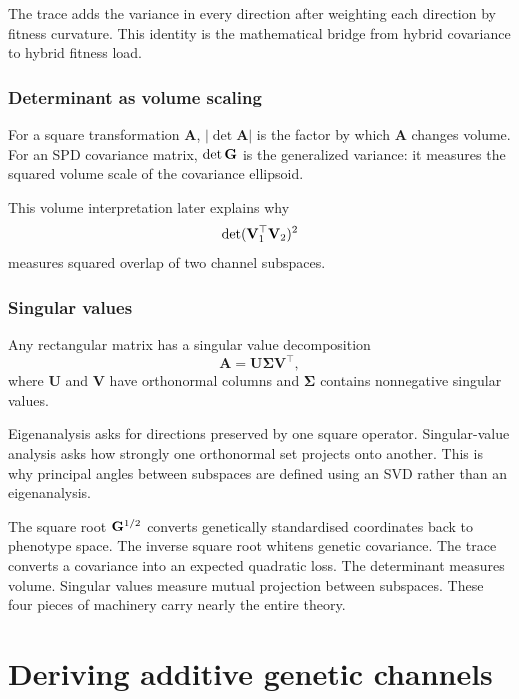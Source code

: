 \inwords The trace adds the variance in every direction after weighting each direction by fitness curvature. This identity is the mathematical bridge from hybrid covariance to hybrid fitness load.

\section{Determinant as volume scaling}

For a square transformation \(\mathbf A\), \(|\det\mathbf A|\) is the factor by which \(\mathbf A\) changes volume. For an SPD covariance matrix, \(\det\mathbf{G}\) is the generalized variance: it measures the squared volume scale of the covariance ellipsoid.

This volume interpretation later explains why
\begin{equation}
\det(\mathbf{V}_1^\top\mathbf{V}_2)^2
\end{equation}
measures squared overlap of two channel subspaces.

\section{Singular values}

Any rectangular matrix has a singular value decomposition
\begin{equation}
\mathbf A=\mathbf U\boldsymbol\Sigma\mathbf V^\top,
\end{equation}
where \(\mathbf U\) and \(\mathbf V\) have orthonormal columns and \(\boldsymbol\Sigma\) contains nonnegative singular values.

\usual Eigenanalysis asks for directions preserved by one square operator. Singular-value analysis asks how strongly one orthonormal set projects onto another. This is why principal angles between subspaces are defined using an SVD rather than an eigenanalysis.

\begin{summarybox}
The square root \(\mathbf{G}^{1/2}\) converts genetically standardised coordinates back to phenotype space. The inverse square root whitens genetic covariance. The trace converts a covariance into an expected quadratic loss. The determinant measures volume. Singular values measure mutual projection between subspaces. These four pieces of machinery carry nearly the entire theory.
\end{summarybox}

\part{Deriving additive genetic channels}
